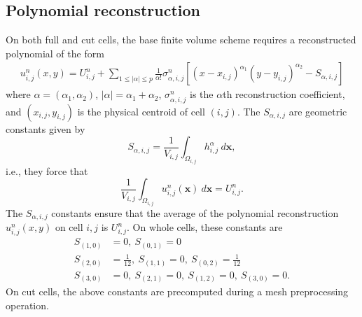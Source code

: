 \subsection{Polynomial reconstruction} \label{sec:ho_reconstruction}
On both full and cut cells, the base finite volume scheme requires a reconstructed polynomial of the form
\begin{equation}\label{eq:uu}
\begin{aligned}
u^n_{i,j} (x,y) = U^n_{i,j} +  \sum_{1 \leq |\alpha| \leq p}  \frac{1}{\alpha!} \sigma^n_{\alpha,i,j} [(x- x_{i,j})^{\alpha_1}(y-y_{i,j})^{\alpha_2}- S_{\alpha,i,j}]
\end{aligned}
\end{equation}
where $\alpha = (\alpha_1, \alpha_2)$, $|\alpha| = \alpha_1 + \alpha_2$, $\sigma^n_{\alpha,i,j}$ is the $\alpha$th reconstruction coefficient, and $ (x_{i,j}, y_{i,j})$ is the physical centroid of cell $(i,j)$. 
The $  S_{\alpha, i,j}$ are geometric constants given by
$$
S_{\alpha, i,j} = \frac{1}{ V_{i,j}}  \int_{\Omega_{i,j}} h_{i,j}^{\alpha}~d\mathbf{x},
$$
i.e., they force that 
\begin{equation} \label{eq:uaverage}
\frac{1}{ V_{i,j}}  \int_{\Omega_{i,j}} u^n_{i,j}(\mathbf{x}) ~d\mathbf{x} = U^n_{i,j}.
\end{equation}
The $ S_{\alpha, i,j}$ constants ensure that the average of the polynomial reconstruction $u^n_{i,j}(x,y)$ on cell $i,j$ is $U^n_{i,j}$.  On whole cells, these constants are
\begin{equation}
	\begin{aligned}
		S_{(1,0)} &= 0, ~ S_{(0,1)} = 0 \\
		S_{(2,0)} &= \frac{1}{12}, ~ S_{(1,1)} = 0, ~ S_{(0,2)} = \frac{1}{12}\\
		S_{(3,0)} &= 0, ~ S_{(2,1)} = 0, ~ S_{(1,2)} = 0, ~ S_{(3,0)} = 0.
	\end{aligned}
\end{equation}
On cut cells, the above constants are precomputed during a mesh preprocessing operation.

